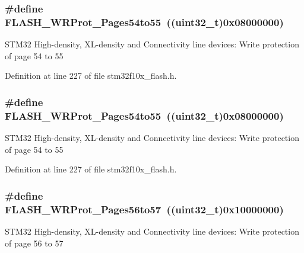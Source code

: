 \subsubsection[{\texorpdfstring{F\+L\+A\+S\+H\+\_\+\+W\+R\+Prot\+\_\+\+Pages54to55}{FLASH_WRProt_Pages54to55}}]{\setlength{\rightskip}{0pt plus 5cm}\#define F\+L\+A\+S\+H\+\_\+\+W\+R\+Prot\+\_\+\+Pages54to55~(({\bf uint32\+\_\+t})0x08000000)}\hypertarget{group___option___bytes___write___protection_gacd4ea5e6cc3819f40a55a61f3075b626}{}\label{group___option___bytes___write___protection_gacd4ea5e6cc3819f40a55a61f3075b626}
S\+T\+M32 High-\/density, X\+L-\/density and Connectivity line devices\+: Write protection of page 54 to 55 

Definition at line 227 of file stm32f10x\+\_\+flash.\+h.

\subsubsection[{\texorpdfstring{F\+L\+A\+S\+H\+\_\+\+W\+R\+Prot\+\_\+\+Pages54to55}{FLASH_WRProt_Pages54to55}}]{\setlength{\rightskip}{0pt plus 5cm}\#define F\+L\+A\+S\+H\+\_\+\+W\+R\+Prot\+\_\+\+Pages54to55~(({\bf uint32\+\_\+t})0x08000000)}\hypertarget{group___option___bytes___write___protection_gacd4ea5e6cc3819f40a55a61f3075b626}{}\label{group___option___bytes___write___protection_gacd4ea5e6cc3819f40a55a61f3075b626}
S\+T\+M32 High-\/density, X\+L-\/density and Connectivity line devices\+: Write protection of page 54 to 55 

Definition at line 227 of file stm32f10x\+\_\+flash.\+h.

\subsubsection[{\texorpdfstring{F\+L\+A\+S\+H\+\_\+\+W\+R\+Prot\+\_\+\+Pages56to57}{FLASH_WRProt_Pages56to57}}]{\setlength{\rightskip}{0pt plus 5cm}\#define F\+L\+A\+S\+H\+\_\+\+W\+R\+Prot\+\_\+\+Pages56to57~(({\bf uint32\+\_\+t})0x10000000)}\hypertarget{group___option___bytes___write___protection_ga1779d1131ad245861c61dbf43a2d2d3d}{}\label{group___option___bytes___write___protection_ga1779d1131ad245861c61dbf43a2d2d3d}
S\+T\+M32 High-\/density, X\+L-\/density and Connectivity line devices\+: Write protection of page 56 to 57 

